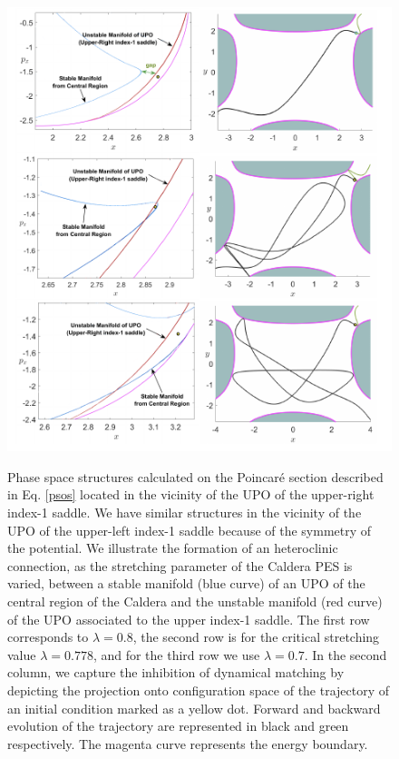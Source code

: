 \documentclass[a4paper,10pt]{article}
\begin{document}
\begin{figure}[htbp]
	\centering
	\includegraphics[scale=0.75]{posld-combo.png}\\
	\caption{Phase space structures calculated on the Poincar\'e section described in Eq. \eqref{psos} located in the vicinity of the UPO of the upper-right index-1 saddle. We have similar structures in the vicinity of the UPO of the upper-left index-1 saddle because of the symmetry of the potential. We illustrate the formation of an heteroclinic connection, as the stretching parameter of the Caldera PES is varied, between a stable manifold (blue curve) of an UPO of the central region of the Caldera and the unstable manifold (red curve) of the UPO associated to the upper index-1 saddle. The first row corresponds to $\lambda = 0.8$, the second row is for the critical stretching value $\lambda = 0.778$, and for the third row we use $\lambda = 0.7$. In the second column, we capture the inhibition of dynamical matching by depicting the projection onto configuration space of the trajectory of an initial condition marked as a yellow dot. Forward and backward evolution of the trajectory are represented in black and green respectively. The magenta curve represents the energy boundary.}
	\label{fig_panel}
\end{figure}








\end{document}
